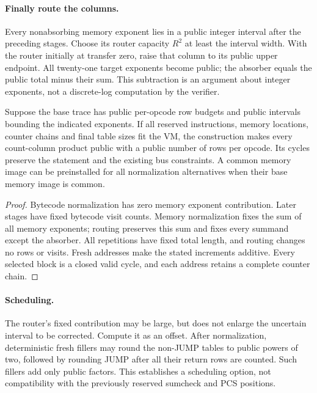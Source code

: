\paragraph{Finally route the columns.} Every nonabsorbing memory exponent lies in a public integer interval after the preceding stages. Choose its router capacity $R^2$ at least the interval width. With the router initially at transfer zero, raise that column to its public upper endpoint. All twenty-one target exponents become public; the absorber equals the public total minus their sum. This subtraction is an argument about integer exponents, not a discrete-log computation by the verifier.

\begin{theorem}
Suppose the base trace has public per-opcode row budgets and public intervals bounding the indicated exponents. If all reserved instructions, memory locations, counter chains and final table sizes fit the VM, the construction makes every count-column product public with a public number of rows per opcode. Its cycles preserve the statement and the existing bus constraints. A common memory image can be preinstalled for all normalization alternatives when their base memory image is common.
\end{theorem}
\begin{proof}
Bytecode normalization has zero memory exponent contribution. Later stages have fixed bytecode visit counts. Memory normalization fixes the sum of all memory exponents; routing preserves this sum and fixes every summand except the absorber. All repetitions have fixed total length, and routing changes no rows or visits. Fresh addresses make the stated increments additive. Every selected block is a closed valid cycle, and each address retains a complete counter chain.
\end{proof}

\paragraph{Scheduling.} The router's fixed contribution may be large, but does not enlarge the uncertain interval to be corrected. Compute it as an offset. After normalization, deterministic fresh fillers may round the non-JUMP tables to public powers of two, followed by rounding JUMP after all their return rows are counted. Such fillers add only public factors. This establishes a scheduling option, not compatibility with the previously reserved sumcheck and PCS positions.


